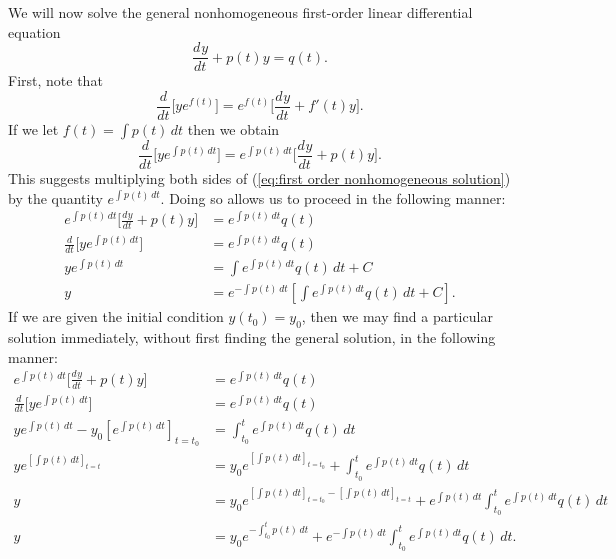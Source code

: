 \documentclass{myart}
\newcommand{\eq}[1]{(\ref{eq:#1})}
\newcommand{\deriv}[3][]{\frac{d^{#1}#2}{d#3^{#1}}}
\begin{document}
We will now solve the general nonhomogeneous first-order linear differential equation
\begin{equation} \label{eq:first order nonhomogeneous solution}
\deriv{y}{t} + p(t)y = q(t).
\end{equation}
First, note that
\begin{equation*}
\deriv{}{t}\Big[ye^{f(t)}\Big] = e^{f(t)}\Big[\deriv{y}{t} + f'(t)y\Big].
\end{equation*}
If we let $f(t) = \int p(t) \,dt$ then we obtain
\begin{equation*}
\deriv{}{t}\Big[ye^{\int p(t) \,dt}\Big] = e^{\int p(t) \,dt}\Big[\deriv{y}{t} + p(t)y\Big].
\end{equation*}
This suggests multiplying both sides of \eq{first order nonhomogeneous solution} by the quantity $e^{\int p(t) \,dt}$. Doing so allows us to proceed in the following manner:
\begin{align*}
e^{\int p(t) \,dt}\Big[\deriv{y}{t} + p(t)y\Big] &= e^{\int p(t) \,dt} q(t) \\
\deriv{}{t} \Big[ye^{\int p(t) \,dt}\Big] &= e^{\int p(t) \,dt} q(t) \\
ye^{\int p(t) \,dt} &= \int e^{\int p(t) \,dt} q(t) \,dt + C \\
y &= e^{-\int p(t) \,dt} \left[\int e^{\int p(t) \,dt} q(t) \,dt + C\right].
\end{align*}
If we are given the initial condition $y(t_0) = y_0$, then we may find a particular solution immediately, without first finding the general solution, in the following manner:
\begin{align*}
e^{\int p(t) \,dt}\Big[\deriv{y}{t} + p(t)y\Big] &= e^{\int p(t) \,dt} q(t) \\
\deriv{}{t} \Big[ye^{\int p(t) \,dt}\Big] &= e^{\int p(t) \,dt} q(t) \\
ye^{\int p(t) \,dt} - y_0\left[e^{\int p(t) \,dt}\right]_{t=t_0} &= \int_{t_0}^t e^{\int p(t) \,dt} q(t) \,dt \\
ye^{\left[\int p(t) \,dt\right]_{t=t}} &= y_0e^{\left[\int p(t) \,dt\right]_{t=t_0}} + \int_{t_0}^t e^{\int p(t) \,dt} q(t) \,dt \\
y &= y_0e^{\left[\int p(t) \,dt\right]_{t=t_0} - \left[\int p(t) \,dt\right]_{t=t}} + e^{\int p(t) \,dt} \int_{t_0}^t e^{\int p(t) \,dt} q(t) \,dt \\
y &= y_0e^{-\int_{t_0}^t p(t) \,dt} + e^{-\int p(t) \,dt} \int_{t_0}^t e^{\int p(t) \,dt} q(t) \,dt.
\end{align*}
\end{document}
